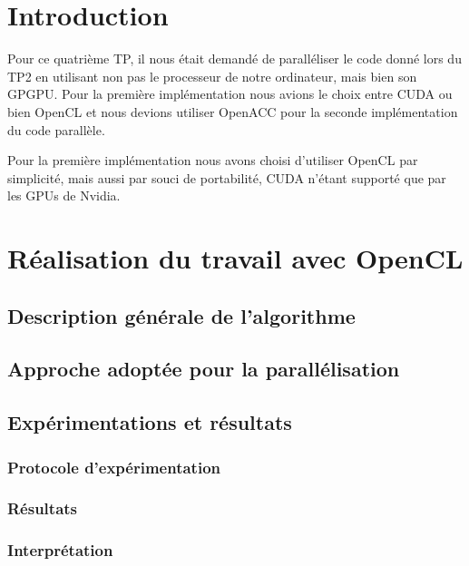 \documentclass[11pt]{report}
\begin{document}
\newpage

\onehalfspace
\tableofcontents
\listoffigures
\listoftables
\newpage
\chapter{Introduction}

	Pour ce quatrième TP, il nous était demandé de paralléliser le code donné lors du TP2 en utilisant non pas le processeur de notre ordinateur, mais bien son GPGPU. Pour la première implémentation nous avions le choix entre CUDA ou bien OpenCL et nous devions utiliser OpenACC pour la seconde implémentation du code parallèle.
	
	\bigskip
	Pour la première implémentation nous avons choisi d'utiliser OpenCL par simplicité, mais aussi par souci de portabilité, CUDA n'étant supporté que par les GPUs de Nvidia.
	
\clearpage
\chapter{Réalisation du travail avec OpenCL}

	\section{Description générale de l'algorithme}
	
	
	\section{Approche adoptée pour la parallélisation}
	
	
	\section{Expérimentations et résultats}
	
		\subsection{Protocole d'expérimentation}
		
		\subsection{Résultats}
		
		\subsection{Interprétation}
	
\end{document}

